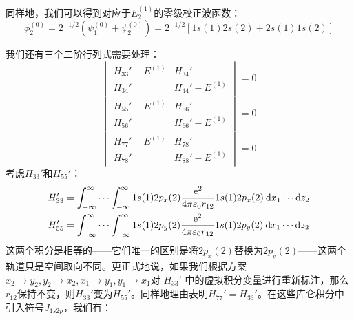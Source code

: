     同样地，我们可以得到对应于$E_2^{(1)}$的零级校正波函数：
    \begin{equation}
        \phi_{2}^{(0)} = 2^{-1/2} \left(\psi_{1}^{(0)} + \psi_{2}^{(0)}\right) = 2^{-1/2} \left[ 1s(1)2s(2) + 2s(1)1s(2) \right]
        \label{eq:9.104}
    \end{equation}

    我们还有三个二阶行列式需要处理：
    \begin{equation}
        \begin{vmatrix}
            H_{33}' - E^{\left(1\right)} & H_{34}' \\
            H_{34}' & H_{44}' - E^{\left(1\right)}
        \end{vmatrix} = 0
        \label{eq:9.105}
    \end{equation}
    \begin{equation}
        \begin{vmatrix}
            H_{55}' - E^{\left(1\right)} & H_{56}' \\
            H_{56}' & H_{66}' - E^{\left(1\right)}
        \end{vmatrix} = 0
        \label{eq:9.106}
    \end{equation}
    \begin{equation}
        \begin{vmatrix}
            H_{77}' - E^{\left(1\right)} & H_{78}' \\
            H_{78}' & H_{88}' - E^{\left(1\right)}
        \end{vmatrix} = 0
        \label{eq:9.107}
    \end{equation}
    考虑$H_{33}'$和$H_{55}'$：
    \begin{equation*}
        \begin{aligned}
            H_{33}' &= \int_{-\infty}^{\infty} \cdots\int_{-\infty}^{\infty} 1s(1)2p_x(2)\frac{\mathrm{e} ^2}{4\pi\varepsilon_0r_{12}} 1s(1)2p_x(2)\:\dd x_1\cdots\dd z_2 \\
            H_{55}' &= \int_{-\infty}^{\infty} \cdots\int_{-\infty}^{\infty} 1s(1)2p_y(2)\frac{\mathrm{e} ^2}{4\pi\varepsilon_0r_{12}} 1s(1)2p_y(2)\:\dd x_1\cdots\dd z_2
        \end{aligned}
    \end{equation*}
    这两个积分是相等的——它们唯一的区别是将$2p_x\left(2\right)$替换为$2p_y\left(2\right)$——这两个轨道只是空间取向不同。更正式地说，如果我们根据方案$x_2 \to y_2, y_2 \to x_2, x_1 \to y_1, y_1 \to x_1$对 $H_{33}'$ 中的虚拟积分变量进行重新标注，那么$r_{12}$保持不变，则$H_{33}'$变为$H_{55}'$。同样地理由表明$H_{77}' = H_{33}'$。在这些库仑积分中引入符号$J_{1s2p}$，我们有：
